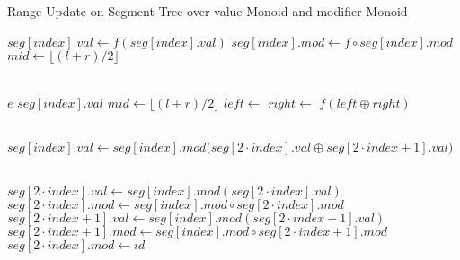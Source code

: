 \begin{algorithm}[H]
    \caption{Range Update on Segment Tree over value Monoid and modifier Monoid }
    \begin{algorithmic}[1]
                \State \Return
                \State $seg[index].val \gets f(seg[index].val)$
                \State $seg[index].mod \gets f \circ seg[index].mod$ 
                \State \Return
            \Else
                \State $mid \gets \lfloor (l + r)/2 \rfloor$
                \State {}
                \State {}
                \State {}
            \EndIf
        \EndProcedure

        \\

                \State \Return $e$
                \State \Return $seg[index].val$
            \Else
                \State $mid \gets \lfloor (l + r)/2 \rfloor$
                \State $left \gets$ 
                \State $right \gets$ 
                \State \Return $f(left \oplus right)$ 
            \EndIf
        \EndProcedure

        \\

            \State $seg[index].val \gets seg[index].mod\big(seg[2 \cdot index].val \oplus seg[2 \cdot index + 1].val\big)$
        \EndProcedure


    \\

        \State $seg[2 \cdot index].val \gets seg[index].mod(seg[2 \cdot index].val) $
        \State $seg[2 \cdot index].mod \gets  seg[index].mod \circ seg[2 \cdot index].mod$
        \State $seg[2 \cdot index + 1].val \gets  seg[index].mod(seg[2 \cdot index + 1].val) $
        \State $seg[2 \cdot index + 1].mod \gets  seg[index].mod \circ seg[2 \cdot index + 1].mod$
        \State $seg[2 \cdot index].mod \gets id$ 
    \EndProcedure
    \end{algorithmic}
\end{algorithm}
